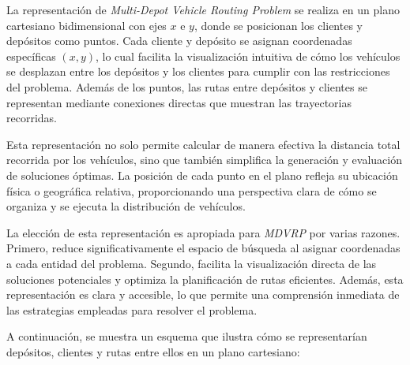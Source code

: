 \documentclass[letter, 10pt]{article}
\begin{document}
La representación de \textit{Multi-Depot Vehicle Routing Problem} se realiza en un plano cartesiano bidimensional con ejes $x$ e $y$, donde se posicionan los clientes y depósitos como puntos. Cada cliente y depósito se asignan coordenadas específicas $(x,y)$, lo cual facilita la visualización intuitiva de cómo los vehículos se desplazan entre los depósitos y los clientes para cumplir con las restricciones del problema. Además de los puntos, las rutas entre depósitos y clientes se representan mediante conexiones directas que muestran las trayectorias recorridas.

Esta representación no solo permite calcular de manera efectiva la distancia total recorrida por los vehículos, sino que también simplifica la generación y evaluación de soluciones óptimas. La posición de cada punto en el plano refleja su ubicación física o geográfica relativa, proporcionando una perspectiva clara de cómo se organiza y se ejecuta la distribución de vehículos.

La elección de esta representación es apropiada para \textit{MDVRP} por varias razones. Primero, reduce significativamente el espacio de búsqueda al asignar coordenadas a cada entidad del problema. Segundo, facilita la visualización directa de las soluciones potenciales y optimiza la planificación de rutas eficientes. Además, esta representación es clara y accesible, lo que permite una comprensión inmediata de las estrategias empleadas para resolver el problema.

A continuación, se muestra un esquema que ilustra cómo se representarían depósitos, clientes y rutas entre ellos en un plano cartesiano:
\end{document}
